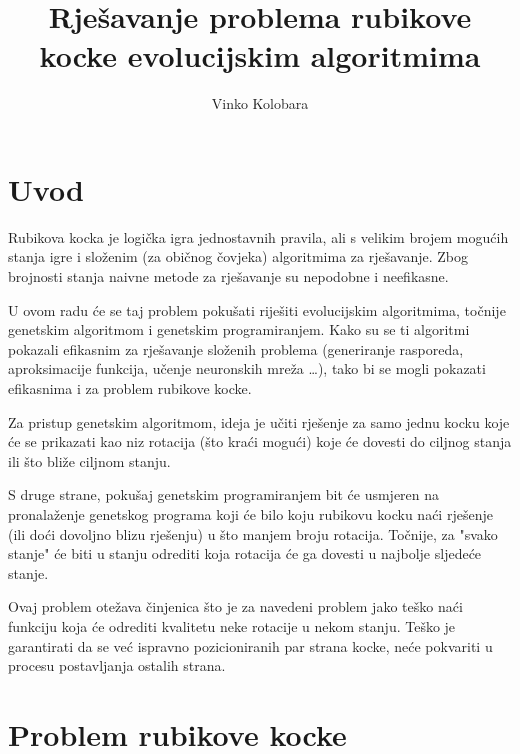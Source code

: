 \documentclass[times, utf8, seminar, numeric]{fer}
\begin{document}
\nocite{*}

\title{Rješavanje problema rubikove kocke evolucijskim algoritmima}

\author{Vinko Kolobara}


\maketitle

\tableofcontents

\chapter{Uvod}

Rubikova kocka je logička igra jednostavnih pravila, ali s velikim brojem mogućih stanja igre i složenim (za običnog čovjeka) algoritmima za rješavanje. Zbog brojnosti stanja naivne metode za rješavanje su nepodobne i neefikasne. 

U ovom radu će se taj problem pokušati riješiti evolucijskim algoritmima, točnije genetskim algoritmom i genetskim programiranjem. Kako su se ti algoritmi pokazali efikasnim za rješavanje složenih problema (generiranje rasporeda, aproksimacije funkcija, učenje neuronskih mreža \dots), tako bi se mogli pokazati efikasnima i za problem rubikove kocke. 

Za pristup genetskim algoritmom, ideja je učiti rješenje za samo jednu kocku koje će se prikazati kao niz rotacija (što kraći mogući) koje će dovesti do ciljnog stanja ili što bliže ciljnom stanju.

S druge strane, pokušaj genetskim programiranjem bit će usmjeren na pronalaženje genetskog programa koji će bilo koju rubikovu kocku naći rješenje (ili doći dovoljno blizu rješenju) u što manjem broju rotacija. Točnije, za "svako stanje" će biti u stanju odrediti koja rotacija će ga dovesti u najbolje sljedeće stanje.

Ovaj problem otežava činjenica što je za navedeni problem jako teško naći funkciju koja će odrediti kvalitetu neke rotacije u nekom stanju. Teško je garantirati da se već ispravno pozicioniranih par strana kocke, neće pokvariti u procesu postavljanja ostalih strana.


\chapter{Problem rubikove kocke}
\end{document}

